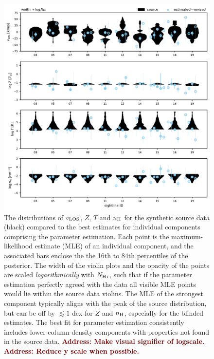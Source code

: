\documentclass[fleqn,usenatbib]{mnras}
\newcommand{\todo}[1]{\textcolor{Maroon}{\textbf{Address: #1}}}
\begin{document}
\begin{figure}
    \centering
    \includegraphics[width=\textwidth]{figures/sample2/violin_vs_components_revised.pdf}
    \caption{
    The distributions of $v_{\rm LOS}$, $Z$, $T$ and $n_{\rm H}$ for the synthetic source data (black) compared to the best estimates for individual components comprising the parameter estimation.
    Each point is the maximum-likelihood estimate (MLE) of an individual component,
    and the associated bars enclose the the 16th to 84th percentiles of the posterior.
    The width of the violin plots and the opacity of the points are scaled \textit{logarithmically} with $N_{\ion{H}{I}}$,
    such that if the parameter estimation perfectly agreed with the data all visible MLE points would lie within the source data violins.
    The MLE of the strongest component typically aligns with the peak of the source distribution, but can be off by $\lesssim 1$ dex for $Z$ and $n_{\rm H}$, especially for the blinded estimates.
    The best fit for parameter estimation consistently includes lower-column-density components with properties not found in the source data.
    \todo{Make visual signifier of logscale.}
    \todo{Reduce y scale when possible.}
    }
    \label{f: sample2 violin vs components}
\end{figure}
\end{document}
